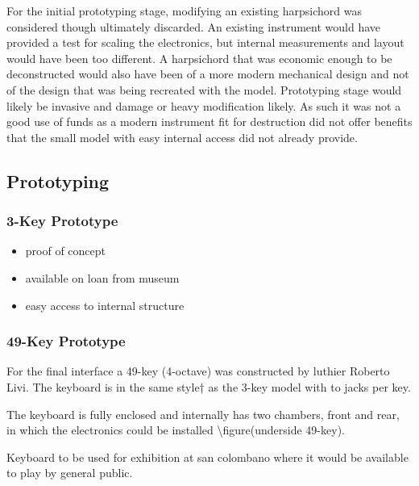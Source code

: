 
For the initial prototyping stage, modifying an existing harpsichord was
considered though ultimately discarded. An existing instrument would
have provided a test for scaling the electronics, but internal
measurements and layout would have been too different. A harpsichord that
was economic enough to be deconstructed would also have been of a more
modern mechanical design and not of the design that was being recreated
with the model. Prototyping stage would likely be invasive and damage or
heavy modification likely. As such it was not a good use of funds as a
modern instrument fit for destruction did not offer benefits that the
small model with easy internal access did not already provide.

\subsection{Prototyping}\label{prototyping}

\subsubsection{3-Key Prototype}\label{key-prototype}

\begin{itemize}
\item
  proof of concept
\item
  available on loan from museum
\item
  easy access to internal structure
\end{itemize}

\subsubsection{49-Key Prototype}\label{key-prototype-1}

For the final interface a 49-key (4-octave) was constructed by luthier
Roberto Livi. The keyboard is in the same style† as the 3-key model with
to jacks per key.

The keyboard is fully enclosed and internally has two chambers, front
and rear, in which the electronics could be installed
\textbackslash figure(underside 49-key).

Keyboard to be used for exhibition at san colombano where it would be
available to play by general public.

